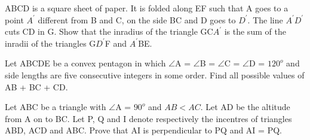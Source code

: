 \item ABCD is a square sheet of paper. It is folded along EF such that A goes to a point $A^{'}$ different from B and C, on the side BC and D goes to $D^{'}$. The line $A^{'} D^{'}$ cuts CD in G. Show that the inradius of the triangle GC$A^{'}$ is the sum of the inradii of the triangles G$D^{'}$F and $A^{'}$BE.

\item Let ABCDE be a convex pentagon in which $\angle$A = $\angle$B = $\angle$C = $\angle$D = $120^{o}$
and side lengths are five consecutive integers in some order. Find all possible values of AB + BC + CD.

\item Let ABC be a triangle with $\angle$A = $90^{o}$ and $AB < AC$. Let AD be the altitude from A on to BC. Let P, Q and I denote respectively the incentres of triangles ABD, ACD and ABC. Prove that AI is perpendicular to PQ and AI = PQ.
























